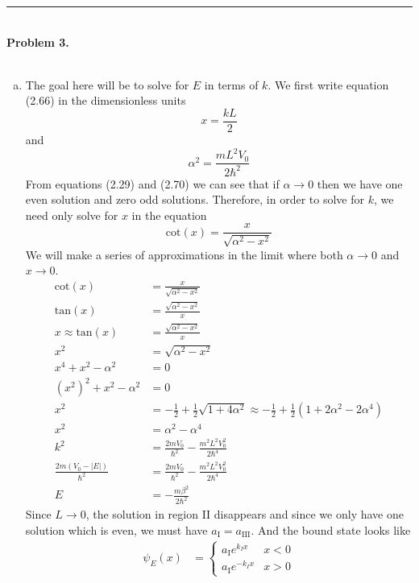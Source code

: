 \documentclass[]{book}
\begin{document}
\noindent\rule{15cm}{0.4pt} \\
{\bf Problem 3.} \\ \\
\begin{enumerate}[(a)]
\item The goal here will be to solve for $E$ in terms of $k$. We first write equation (2.66) in the dimensionless units $$x = \frac{kL}{2}$$ and $$\alpha^2=\frac{mL^2V_0}{2\hbar^2}$$
From equations (2.29) and (2.70) we can see that if $\alpha\to 0$ then we have one even solution and zero odd solutions. Therefore, in order to solve for $k$, we need only solve for $x$ in the equation
\begin{equation}
\textrm{cot}(x)=\frac{x}{\sqrt{\alpha^2-x^2}}
\end{equation}
We will make a series of approximations in the limit where both $\alpha\to 0$ and $x\to 0$. 
\begin{equation}
\begin{split}
\textrm{cot}(x) &=\frac{x}{\sqrt{\alpha^2-x^2}} \\
\textrm{tan}(x) &=\frac{\sqrt{\alpha^2-x^2}}{x} \\
x \approx \textrm{tan}(x) &=\frac{\sqrt{\alpha^2-x^2}}{x} \\
x^2 &= \sqrt{\alpha^2-x^2} \\
x^4 +x^2-\alpha^2 &=0 \\
(x^2)^2+x^2-\alpha^2 &=0 \\
x^2 &= -\frac{1}{2} + \frac{1}{2}\sqrt{1+4\alpha^2} \approx -\frac{1}{2} + \frac{1}{2}(1+2\alpha^2-2\alpha^4) \\
x^2 &=\alpha^2 -\alpha^4 \\
k^2 &=\frac{2mV_0}{\hbar^2} -\frac{m^2L^2V_0^2}{2\hbar^4} \\
\frac{2m(V_0-|E|)}{\hbar^2} &= \frac{2mV_0}{\hbar^2} -\frac{m^2L^2V_0^2}{2\hbar^4} \\
E &= -\frac{m\beta^2}{2\hbar^2}
\end{split}
\end{equation}
Since $L\to 0$, the solution in region II disappears and since we only have one solution which is even, we must have $a_\textrm{I}=a_\textrm{III}$. And the bound state looks like
\begin{equation}
\begin{split}
\psi_E(x) &= 
\begin{cases}
a_\textrm{I}e^{k_I x} & x<0 \\
a_\textrm{I}e^{-k_I x} & x>0 
\end{cases}\\

\end{split}
\end{equation}
\end{enumerate}
\end{document}
